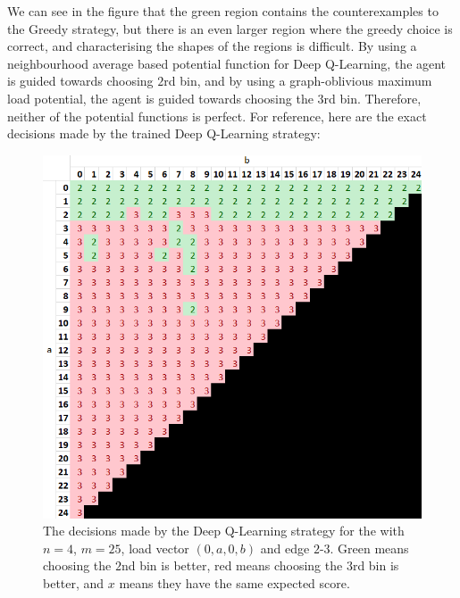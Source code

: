 We can see in the figure that the green region contains the counterexamples to the Greedy strategy, but there is an even larger region where the greedy choice is correct, and characterising the shapes of the regions is difficult. By using a neighbourhood average based potential function for Deep Q-Learning, the agent is guided towards choosing $2$rd bin, and by using a graph-oblivious maximum load potential, the agent is guided towards choosing the $3$rd bin. Therefore, neither of the potential functions is perfect. For reference, here are the exact decisions made by the trained Deep Q-Learning strategy: 


\begin{figure}[hbt!] \label{greedy-counterexample-analysed-for-dqn}
    \centering
    \includegraphics[scale=1.0]{Chapter4/Figs/0a0b_4_25_analysis_dqn.png}
    \caption{The decisions made by the Deep Q-Learning strategy for the \CycleGraph with $n=4$, $m=25$, load vector $(0,a,0,b)$ and edge $2$-$3$. Green means choosing the $2$nd bin is better, red means choosing the $3$rd bin is better, and $x$ means they have the same expected score.}
\end{figure}

